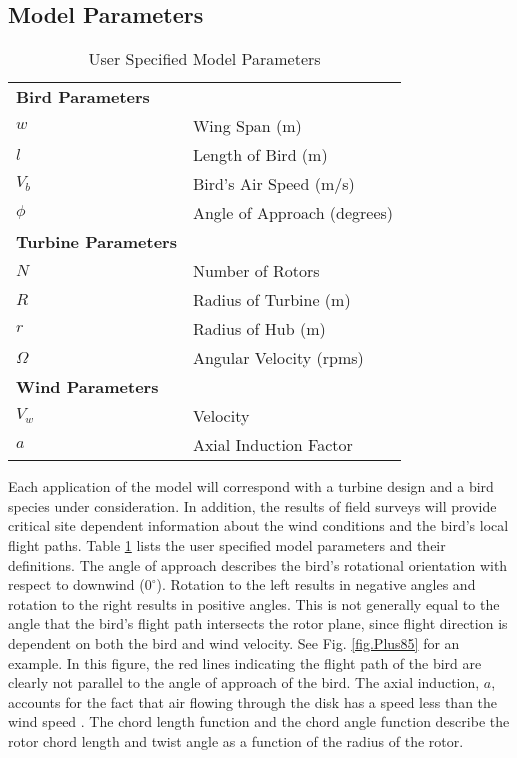\label{} \documentclass[10pt,conference]{IEEEtran}
\begin{document}
\subsection{Model Parameters}
\begin{table}
  \centering
  \vspace{1 mm}
  \begin{tabular}{|ll|}
  \hline
  \textbf{Bird Parameters} &\\
  $w$ & Wing Span (m)\\
  $l$ & Length of Bird (m)\\
  $V_b$ & Bird's Air Speed (m/s)\\
  $\phi$ & Angle of Approach (degrees)\\
  \hline
  \textbf{Turbine Parameters} & \\
  $N$ & Number of Rotors\\
  $R$ & Radius of Turbine (m)\\
  $r$ & Radius of Hub (m)\\
  $\Omega$ & Angular Velocity (rpms)\\
  \hline
  \textbf{Wind Parameters} &\\
  $V_w$ & Velocity\\
  $a$ & Axial Induction Factor\\
  \hline
  \end{tabular}
  \caption{User Specified Model Parameters}
  \label{table.user_parameters}
\end{table}


Each application of the model will correspond with a turbine design and a bird species under consideration. In
addition, the results of field surveys will provide critical site dependent information about the wind conditions and
the bird's local flight paths. Table \ref{table.user_parameters} lists the user specified model parameters and their
definitions. The angle of approach describes the bird's rotational orientation with respect to downwind ($0^\circ$).
Rotation to the left results in negative angles and rotation to the right results in positive angles. This is not
generally equal to the angle that the bird's flight path intersects the rotor plane, since flight direction is
dependent on both the bird and wind velocity. See Fig. \ref{fig.Plus85} for an example. In this figure, the red lines
indicating the flight path of the bird are clearly not parallel to the angle of approach of the bird. The axial
induction, $a$, accounts for the fact that air flowing through the disk has a speed less than the wind speed
\cite{Wilson1994}.
The chord length function and the chord angle function describe the rotor chord length and twist angle as a function of
the radius of the rotor.
\end{document}
